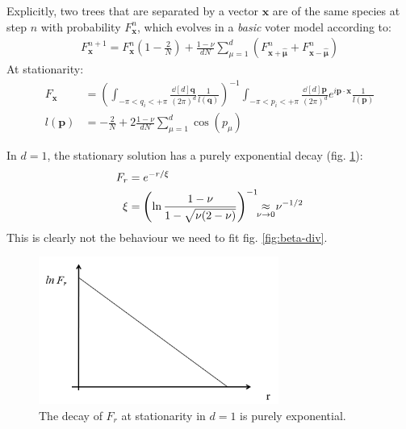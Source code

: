 \documentclass[../../main.tex]{subfiles}
\begin{document}
\medskip
Explicitly, two trees that are separated by a vector $\bm{x}$ are of the same species at step $n$ with probability $F_{\bm{x}}^{n}$, which evolves in a \textit{basic} voter model according to:
\begin{align}\label{eqn:beta-evo}
    F_{\bm{x}}^{n+1} = F_{\bm{x}}^n \left(1 - \frac{2}{N} \right) + \frac{1-\nu}{d N} \sum_{\mu=1}^d (F_{\bm{x} + \bm{\hat{\mu}}}^n + F_{\bm{x} - \bm{\hat{\mu}}}^n) 
\end{align}
At stationarity:
\begin{align*}
    F_{\bm{x}} &= \left(\int_{-\pi < q_i < +\pi} \frac{\dd[d]{\bm{q}}}{(2\pi)^d} \frac{1}{l(\bm{q})}  \right)^{-1} \int_{-\pi < p_i < +\pi} \frac{\dd[d]{\bm{p}}}{(2\pi)^d} e^{i \bm{p} \cdot \bm{x}} \frac{1}{l(\bm{p})}\\
    l(\bm{p}) &= -\frac{2}{N} + 2 \frac{1-\nu}{d N} \sum_{\mu=1}^d \cos(p_\mu)  
\end{align*}

In $d = 1$, the stationary solution has a purely exponential decay (fig. \ref{fig:stat-beta-decay}):
\begin{align*}
    F_r &= e^{-r/\xi}\\
    \xi &= \left(\ln \frac{1-\nu}{1 - \sqrt{\nu(2-\nu)}} \right)^{-1} \underset{\mathclap{\nu \to 0}}{\approx} \> \nu^{-1/2}
\end{align*}
This is clearly not the behaviour we need to fit fig. \ref{fig:beta-div}. 

\begin{figure}[H]
    \centering
    \includegraphics[width=0.7\textwidth]{stat-beta-decay.png}
    \caption{The decay of $F_r$ at stationarity in $d=1$ is purely exponential.}
    \label{fig:stat-beta-decay}
\end{figure}
\end{document}

